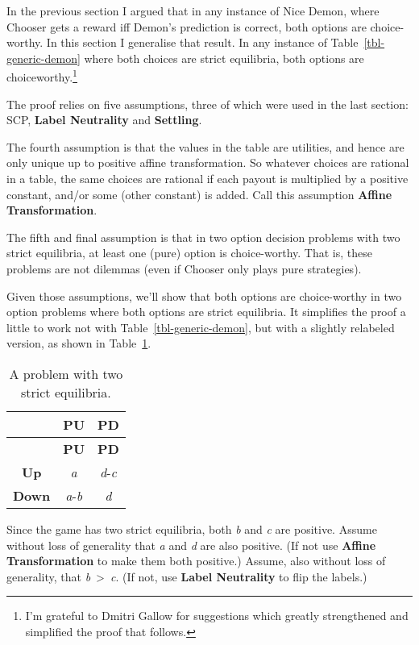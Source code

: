 \documentclass[
  11pt,
  letterpaper,
  DIV=11,
  numbers=noendperiod,
  twoside]{scrartcl}
\begin{document}
In the previous section I argued that in any instance of Nice Demon,
where Chooser gets a reward iff Demon's prediction is correct, both
options are choice-worthy. In this section I generalise that result. In
any instance of Table~\ref{tbl-generic-demon} where both choices are
strict equilibria, both options are choiceworthy.\footnote{I'm grateful
  to Dmitri Gallow for suggestions which greatly strengthened and
  simplified the proof that follows.}

The proof relies on five assumptions, three of which were used in the
last section: SCP, \textbf{Label Neutrality} and \textbf{Settling}.

The fourth assumption is that the values in the table are utilities, and
hence are only unique up to positive affine transformation. So whatever
choices are rational in a table, the same choices are rational if each
payout is multiplied by a positive constant, and/or some (other
constant) is added. Call this assumption \textbf{Affine Transformation}.

The fifth and final assumption is that in two option decision problems
with two strict equilibria, at least one (pure) option is choice-worthy.
That is, these problems are not dilemmas (even if Chooser only plays
pure strategies).

Given those assumptions, we'll show that both options are choice-worthy
in two option problems where both options are strict equilibria. It
simplifies the proof a little to work not with
Table~\ref{tbl-generic-demon}, but with a slightly relabeled version, as
shown in Table~\ref{tbl-two-good}.

\begin{longtable}[]{@{}ccc@{}}
\caption{A problem with two strict
equilibria.}\label{tbl-two-good}\tabularnewline
\toprule\noalign{}
& \textbf{PU} & \textbf{PD} \\
\midrule\noalign{}
\endfirsthead
\toprule\noalign{}
& \textbf{PU} & \textbf{PD} \\
\midrule\noalign{}
\endhead
\bottomrule\noalign{}
\endlastfoot
\textbf{Up} & \emph{a} & \emph{d}-\emph{c} \\
\textbf{Down} & \emph{a}-\emph{b} & \emph{d} \\
\end{longtable}

Since the game has two strict equilibria, both \emph{b} and \emph{c} are
positive. Assume without loss of generality that \emph{a} and \emph{d}
are also positive. (If not use \textbf{Affine Transformation} to make
them both positive.) Assume, also without loss of generality, that
\emph{b}~\textgreater~\emph{c}. (If not, use \textbf{Label Neutrality}
to flip the labels.)
\end{document}
